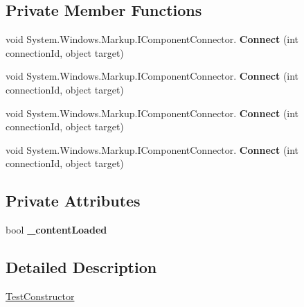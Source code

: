 \subsection*{Private Member Functions}
\begin{DoxyCompactItemize}
\item 
\mbox{\label{class_t_h_b___plugin___exams_1_1_test_constructor_a22d27f93166ca180758b1aea7adcf6e0}} 
void System.\+Windows.\+Markup.\+I\+Component\+Connector. {\bfseries Connect} (int connection\+Id, object target)
\item 
\mbox{\label{class_t_h_b___plugin___exams_1_1_test_constructor_a22d27f93166ca180758b1aea7adcf6e0}} 
void System.\+Windows.\+Markup.\+I\+Component\+Connector. {\bfseries Connect} (int connection\+Id, object target)
\item 
\mbox{\label{class_t_h_b___plugin___exams_1_1_test_constructor_a22d27f93166ca180758b1aea7adcf6e0}} 
void System.\+Windows.\+Markup.\+I\+Component\+Connector. {\bfseries Connect} (int connection\+Id, object target)
\item 
\mbox{\label{class_t_h_b___plugin___exams_1_1_test_constructor_a22d27f93166ca180758b1aea7adcf6e0}} 
void System.\+Windows.\+Markup.\+I\+Component\+Connector. {\bfseries Connect} (int connection\+Id, object target)
\end{DoxyCompactItemize}
\subsection*{Private Attributes}
\begin{DoxyCompactItemize}
\item 
\mbox{\label{class_t_h_b___plugin___exams_1_1_test_constructor_a1eaeb6477f25dff83c567410511fad08}} 
bool {\bfseries \+\_\+content\+Loaded}
\end{DoxyCompactItemize}


\subsection{Detailed Description}
\mbox{\hyperlink{class_t_h_b___plugin___exams_1_1_test_constructor}{Test\+Constructor}} 


